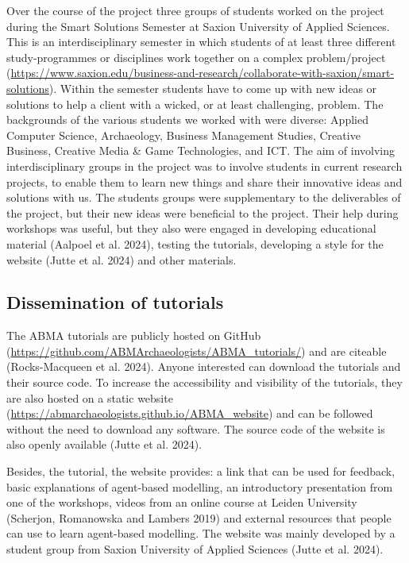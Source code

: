 \documentclass[
]{article}
\begin{document}
Over the course of the project three groups of students worked on the project during the Smart Solutions Semester at Saxion University of Applied Sciences. This is an interdisciplinary semester in which students of at least three different study-programmes or disciplines work together on a complex problem/project (\url{https://www.saxion.edu/business-and-research/collaborate-with-saxion/smart-solutions}). Within the semester students have to come up with new ideas or solutions to help a client with a wicked, or at least challenging, problem. The backgrounds of the various students we worked with were diverse: Applied Computer Science, Archaeology, Business Management Studies, Creative Business, Creative Media \& Game Technologies, and ICT. The aim of involving interdisciplinary groups in the project was to involve students in current research projects, to enable them to learn new things and share their innovative ideas and solutions with us. The students groups were supplementary to the deliverables of the project, but their new ideas were beneficial to the project. Their help during workshops was useful, but they also were engaged in developing educational material (Aalpoel et al. 2024), testing the tutorials, developing a style for the website (Jutte et al. 2024) and other materials.

\hypertarget{dissemination-of-tutorials}{%
\subsection{Dissemination of tutorials}\label{dissemination-of-tutorials}}

The ABMA tutorials are publicly hosted on GitHub (\url{https://github.com/ABMArchaeologists/ABMA_tutorials/}) and are citeable (Rocks-Macqueen et al. 2024). Anyone interested can download the tutorials and their source code. To increase the accessibility and visibility of the tutorials, they are also hosted on a static website (\url{https://abmarchaeologists.github.io/ABMA_website}) and can be followed without the need to download any software. The source code of the website is also openly available (Jutte et al. 2024).

Besides, the tutorial, the website provides: a link that can be used for feedback, basic explanations of agent-based modelling, an introductory presentation from one of the workshops, videos from an online course at Leiden University (Scherjon, Romanowska and Lambers 2019) and external resources that people can use to learn agent-based modelling. The website was mainly developed by a student group from Saxion University of Applied Sciences (Jutte et al. 2024).
\end{document}
